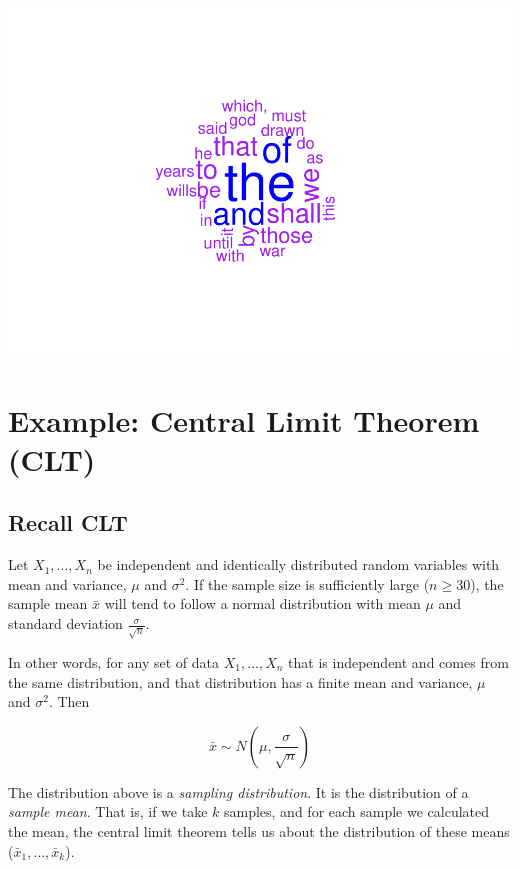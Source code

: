 \documentclass[
]{book}
\begin{document}
\includegraphics{_main_files/figure-latex/unnamed-chunk-227-1.pdf}

\hypertarget{example-central-limit-theorem-clt}{%
\section{Example: Central Limit Theorem (CLT)}\label{example-central-limit-theorem-clt}}

\hypertarget{recall-clt}{%
\subsection{Recall CLT}\label{recall-clt}}

Let \(X_1, ..., X_n\) be independent and identically distributed random variables with mean and variance, \(\mu\) and \(\sigma^2\). If the sample size is sufficiently large (\(n \geq 30\)), the sample mean \(\bar{x}\) will tend to follow a normal distribution with mean \(\mu\) and standard deviation \(\frac{\sigma}{\sqrt{n}}\).

In other words, for any set of data \(X_1, ..., X_n\) that is independent and comes from the same distribution, and that distribution has a finite mean and variance, \(\mu\) and \(\sigma^2\). Then

\[\bar{x} \sim N \left ( \mu, \frac{\sigma}{\sqrt{n}} \right ) \]

The distribution above is a \emph{sampling distribution}. It is the distribution of a \emph{sample mean}. That is, if we take \(k\) samples, and for each sample we calculated the mean, the central limit theorem tells us about the distribution of these means (\(\bar{x}_1, \dots, \bar{x}_k\)).
\end{document}
